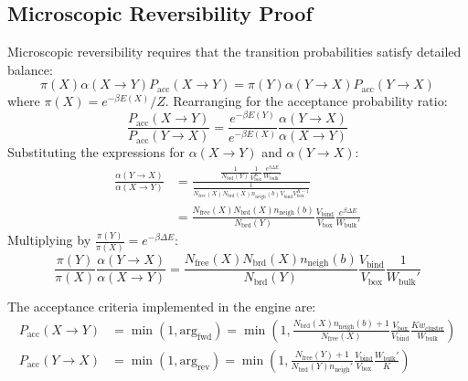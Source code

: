 \documentclass[11pt,a4paper]{article}
\begin{document}
\subsection{Microscopic Reversibility Proof}
Microscopic reversibility requires that the transition probabilities satisfy detailed balance:
\begin{equation}
\pi(X) \alpha(X \to Y) P_{\text{acc}}(X \to Y) = \pi(Y) \alpha(Y \to X) P_{\text{acc}}(Y \to X)
\end{equation}
where $\pi(X) = e^{-\beta E(X)} / Z$. Rearranging for the acceptance probability ratio:
\begin{equation}
\frac{P_{\text{acc}}(X \to Y)}{P_{\text{acc}}(Y \to X)} = \frac{e^{-\beta E(Y)}}{e^{-\beta E(X)}} \frac{\alpha(Y \to X)}{\alpha(X \to Y)}
\end{equation}
Substituting the expressions for $\alpha(X \to Y)$ and $\alpha(Y \to X)$:
\begin{align}
\frac{\alpha(Y \to X)}{\alpha(X \to Y)} &= \frac{\frac{1}{N_{\text{brd}}(Y)} \frac{1}{V_{\text{box}}^K} \frac{e^{\beta \Delta E}}{W_{\text{bulk}}'}}{\frac{1}{N_{\text{free}}(X) N_{\text{brd}}(X) n_{\text{neigh}}(b) V_{\text{bind}} V_{\text{box}}^{K-1}}} \nonumber \\
&= \frac{N_{\text{free}}(X) N_{\text{brd}}(X) n_{\text{neigh}}(b)}{N_{\text{brd}}(Y)} \frac{V_{\text{bind}}}{V_{\text{box}}} \frac{e^{\beta \Delta E}}{W_{\text{bulk}}'}
\end{align}
Multiplying by $\frac{\pi(Y)}{\pi(X)} = e^{-\beta \Delta E}$:
\begin{equation}
\frac{\pi(Y)}{\pi(X)} \frac{\alpha(Y \to X)}{\alpha(X \to Y)} = \frac{N_{\text{free}}(X) N_{\text{brd}}(X) n_{\text{neigh}}(b)}{N_{\text{brd}}(Y)} \frac{V_{\text{bind}}}{V_{\text{box}}} \frac{1}{W_{\text{bulk}}'}
\end{equation}

The acceptance criteria implemented in the engine are:
\begin{align}
P_{\text{acc}}(X \to Y) &= \min\left(1, \text{arg}_{\text{fwd}}\right) = \min\left(1, \frac{N_{\text{brd}}(X) n_{\text{neigh}}(b) + 1}{N_{\text{free}}(X)} \frac{V_{\text{box}}}{V_{\text{bind}}} \frac{K w_{\text{cluster}}}{W_{\text{bulk}}}\right) \\
P_{\text{acc}}(Y \to X) &= \min\left(1, \text{arg}_{\text{rev}}\right) = \min\left(1, \frac{N_{\text{free}}(Y) + 1}{N_{\text{brd}}(Y) n_{\text{neigh}}'} \frac{V_{\text{bind}}}{V_{\text{box}}} \frac{W_{\text{bulk}}'}{K}\right)
\end{align}
\end{document}
